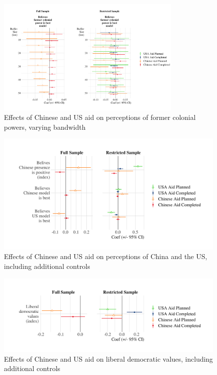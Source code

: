 \documentclass[9pt]{article}
\begin{document}
\begin{figure}[H]
\centering
\caption{Effects of Chinese and US aid on perceptions of former colonial powers, varying bandwidth}
\includegraphics[width=0.8\textwidth]{figures/figure_a14.png} %
\end{figure}

\begin{figure}[H]
\centering
\caption{Effects of Chinese and US aid on perceptions of China and the US, including additional controls}
\includegraphics[width=1\textwidth]{figures/figure_a15.png} %
\end{figure}

\begin{figure}[H]
\centering
\caption{Effects of Chinese and US aid on liberal democratic values, including additional controls}
\includegraphics[width=1\textwidth]{figures/figure_a16.png} %
\end{figure}
\end{document}
